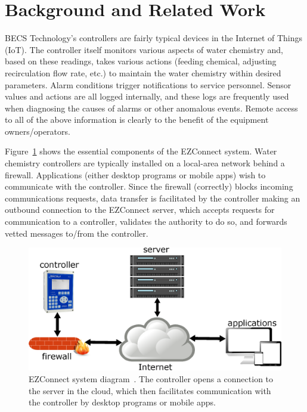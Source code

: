 \section{Background and Related Work}
\label{sec:background}

BECS Technology's controllers are fairly typical devices
in the Internet of Things (IoT).
The controller itself monitors various aspects of water chemistry
and, based on these readings, takes various actions
(feeding chemical, adjusting recirculation flow rate, etc.) to maintain
the water chemistry within desired parameters.
Alarm conditions trigger notifications to service personnel.
Sensor values and actions are all logged internally,
and these logs are frequently used when diagnosing the causes
of alarms or other anomalous events.
Remote access to all of the above information is
clearly to the benefit of the equipment owners/operators.

Figure~\ref{ezconnect} shows the essential components of the EZConnect
system.
Water chemistry controllers are typically installed on a local-area network
behind a firewall.
Applications (either desktop programs or mobile apps) wish to communicate
with the controller.  Since the firewall (correctly) blocks incoming
communications requests, data transfer is facilitated by the controller
making an outbound connection to the EZConnect server, which accepts
requests for communication to a controller, validates the authority to do
so, and forwards vetted messages to/from the controller.

\begin{figure}[htbp]
 \center
\includegraphics[width=0.9\columnwidth]{EZConnect}
    \caption{EZConnect system diagram~\protect\cite{ezconnect}. The controller
opens a connection to the server in the cloud, which then facilitates communication with the controller by desktop programs or mobile apps.}
    \label{ezconnect}
\end{figure}

